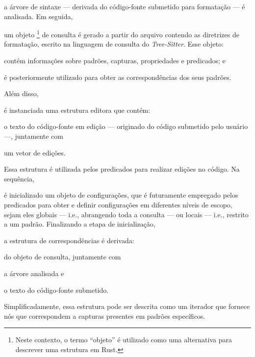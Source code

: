\documentclass
  [11pt,a4paper,english,brazil,openright,sumario=tradicional,twoside]
  {abntex2}
\newcommand{\treesitter}{\textit{Tree-Sitter}\xspace}
\begin{document}
  \begin{inparaenum}
    \item a árvore de sintaxe --- derivada do código-fonte submetido para
          formatação --- é analisada. Em seguida,
    \item um objeto%
          \footnote
            { Neste contexto, o termo ``objeto'' é utilizado como uma
              alternativa para descrever uma estrutura em Rust.}
          de consulta é gerado a partir do arquivo contendo as
          diretrizes de formatação, escrito na linguagem de consulta do
          \treesitter. Esse objeto:
          \begin{inparaenum}
            \item contém informações sobre padrões, capturas, propriedades e
                  predicados; e
            \item é posteriormente utilizado para obter as correspondências
                  dos seus padrões.
          \end{inparaenum}

          Além disso,
    \item é instanciada uma estrutura editora que contém:
          \begin{inparaenum}
            \item o texto do código-fonte em edição --- originado do código
                  submetido pelo usuário ---, juntamente com
            \item um vetor de edições.
          \end{inparaenum}
          Essa estrutura é utilizada pelos predicados para realizar edições no
          código. Na sequência,
    \item é inicializado um objeto de configurações, que é futuramente
          empregado pelos predicados para obter e definir configurações em
          diferentes níveis de escopo, sejam eles globais --- i.e., abrangendo
          toda a consulta --- ou locais --- i.e., restrito a um padrão.
          Finalizando a etapa de inicialização,
    \item a estrutura de correspondências é derivada:
          \begin{inparaenum}
            \item do objeto de consulta, juntamente com
            \item a árvore analisada e
            \item o texto do código-fonte submetido.
          \end{inparaenum}
          Simplificadamente, essa estrutura pode ser descrita como um iterador
          que fornece nós que correspondem a capturas presentes em padrões
          específicos.
  \end{inparaenum}
\end{document}
